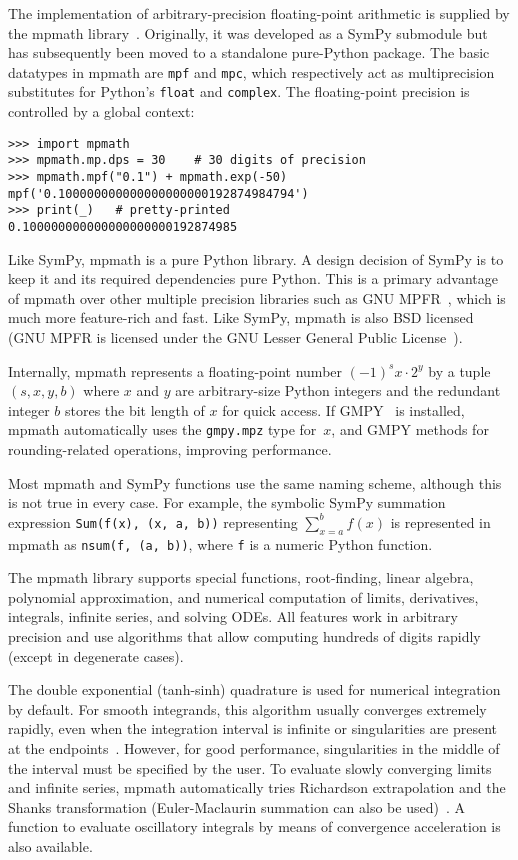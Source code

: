 The implementation of arbitrary-precision floating-point arithmetic is
supplied by the mpmath library~\cite{mpmath}. Originally, it was developed as a SymPy
submodule but has subsequently been moved to a standalone pure-Python package.
The basic datatypes in mpmath are \texttt{mpf} and \texttt{mpc}, which
respectively act as multiprecision substitutes for Python's \texttt{float} and
\texttt{complex}. The floating-point precision is controlled by a global
context:

\begin{verbatim}
>>> import mpmath
>>> mpmath.mp.dps = 30    # 30 digits of precision
>>> mpmath.mpf("0.1") + mpmath.exp(-50)
mpf('0.100000000000000000000192874984794')
>>> print(_)   # pretty-printed
0.100000000000000000000192874985
\end{verbatim}

Like SymPy, mpmath is a pure Python library.  A design decision of SymPy is to
keep it and its required dependencies pure Python. This is a primary advantage
 of mpmath over other multiple precision libraries such as GNU MPFR~\cite{Fousse:2007:MMB:1236463.1236468},
which is much more feature-rich and fast.  Like SymPy, mpmath is also BSD
licensed (GNU MPFR is licensed under the GNU Lesser General Public License~\cite{rosen2005open}).

Internally, mpmath represents
a floating-point number ${(-1)}^s x \cdot 2^y$ by a tuple $(s, x, y, b)$ where
$x$ and $y$ are arbitrary-size Python integers
and the redundant integer $b$ stores the bit length of $x$ for quick access.
If GMPY~\cite{GMPY} is installed, mpmath automatically uses
the \texttt{gmpy.mpz} type for~$x$, and GMPY methods
for rounding-related operations, improving performance.

Most mpmath and SymPy functions use the same naming scheme, although this is
not true in every case. For example, the symbolic SymPy summation expression
\texttt{Sum(f(x), (x, a, b))} representing $\sum_{x=a}^b f(x)$ is represented
in mpmath as \texttt{nsum(f, (a, b))}, where \texttt{f} is a numeric Python
function.

The mpmath library supports
special functions, root-finding, linear algebra, polynomial approximation,
and numerical computation of limits, derivatives, integrals, infinite
series, and solving ODEs. All features work in arbitrary precision
and use algorithms that allow computing hundreds of digits rapidly
(except in degenerate cases).

The double exponential (tanh-sinh) quadrature is used for numerical
integration by default. For smooth integrands, this algorithm usually
converges extremely rapidly, even when the integration interval is infinite
or singularities are present at the endpoints~\cite{takahasi1974double,bailey2005comparison}.
However, for good performance, singularities
in the middle of the interval must be specified
by the user.
To evaluate slowly converging limits and infinite series, mpmath
automatically tries Richardson extrapolation and the
Shanks transformation
(Euler-Maclaurin summation can also be used)~\cite{BenderOrszag1999}.
A function to evaluate oscillatory integrals by means of convergence
acceleration is also available.

